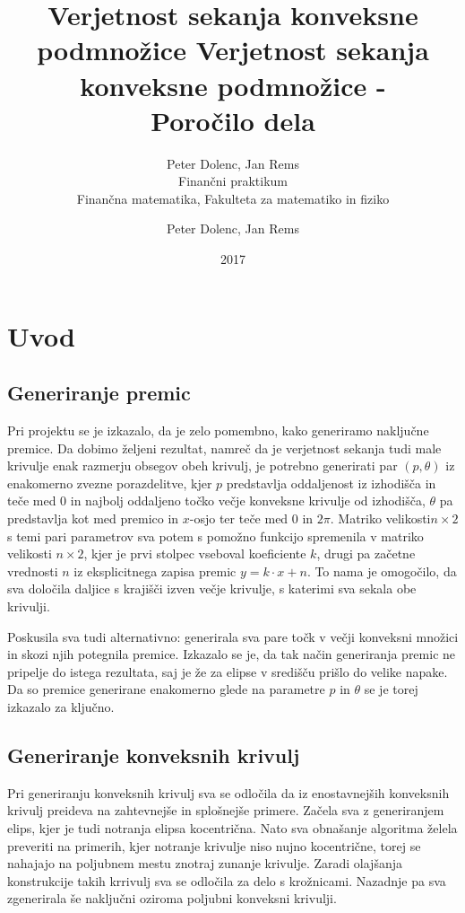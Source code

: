 \documentclass[a4paper]{article}
\title{Verjetnost sekanja konveksne podmnožice}
\author{Peter Dolenc, Jan Rems \\ Finančni praktikum \\ Finančna matematika, Fakulteta za matematiko in fiziko}
\date{2017}
\begin{document}
\title{%
  Verjetnost sekanja konveksne podmnožice -\\
   \large Poročilo dela \\}

\author{Peter Dolenc, Jan Rems}

\maketitle

\pagebreak

\section{Uvod}

\subsection{Generiranje premic}
Pri projektu se je izkazalo, da je zelo pomembno, kako generiramo naključne premice. Da dobimo željeni rezultat, namreč da je verjetnost sekanja tudi male krivulje enak razmerju obsegov obeh krivulj, je potrebno generirati par $(p, \theta)$ iz enakomerno zvezne porazdelitve, kjer $p$ predstavlja oddaljenost iz izhodišča in teče med $0$ in najbolj oddaljeno točko večje konveksne krivulje od izhodišča, $\theta$ pa predstavlja kot med premico in $x$-osjo ter teče med $0$ in $2\pi$. Matriko velikosti$n\times2$ s temi pari parametrov sva potem s pomožno funkcijo spremenila v matriko velikosti $n\times2$, kjer je prvi stolpec vseboval koeficiente $k$, drugi pa začetne vrednosti $n$ iz eksplicitnega zapisa premic $y=k\cdot x+n$. To nama je omogočilo, da sva določila daljice s krajišči izven večje krivulje, s katerimi sva sekala obe krivulji.

Poskusila sva tudi alternativno: generirala sva pare točk v večji konveksni množici in skozi njih potegnila premice. Izkazalo se je, da tak način generiranja premic ne pripelje do istega rezultata, saj je že za elipse v središču prišlo do velike napake. Da so premice generirane enakomerno glede na parametre $p$ in $\theta$ se je torej izkazalo za ključno.

\subsection{Generiranje konveksnih krivulj}
Pri generiranju konveksnih krivulj sva se odločila da iz enostavnejših konveksnih krivulj preideva na zahtevnejše in splošnejše primere. Začela sva z generiranjem elips, kjer je tudi notranja elipsa kocentrična. Nato sva obnašanje algoritma želela preveriti na primerih, kjer notranje krivulje niso nujno kocentrične, torej se nahajajo na poljubnem mestu znotraj zunanje krivulje. Zaradi olajšanja konstrukcije takih krrivulj sva se odločila za delo s krožnicami. Nazadnje pa sva zgenerirala še naključni oziroma poljubni konveksni krivulji. 
\end{document}
